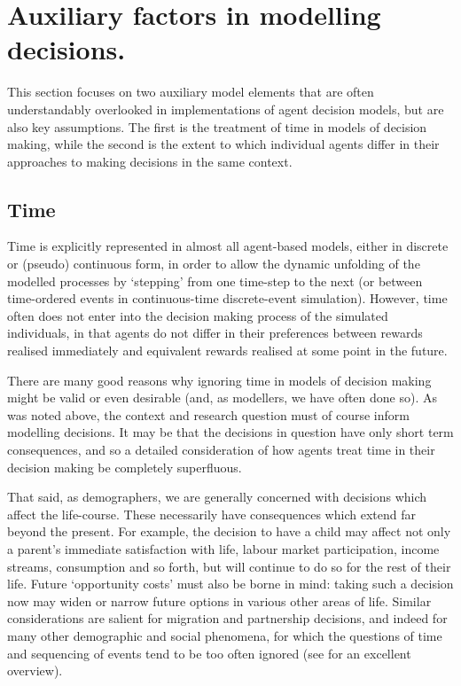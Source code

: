 \documentclass{article}
\begin{document}
\section{Auxiliary factors in modelling
decisions.}\label{auxiliary-factors-in-modelling-decisions}

This section focuses on two auxiliary model elements that are often understandably overlooked in implementations of agent decision models, but are also key assumptions. The first is the treatment of time in models of decision making, while the second is the extent to which individual agents differ in their approaches to making decisions in the same context.

\subsection{Time}\label{time}

Time is explicitly represented in almost all agent-based models, either in discrete or (pseudo) continuous form, in order to allow the dynamic unfolding of the modelled processes by `stepping' from one time-step to the next (or between time-ordered events in continuous-time discrete-event simulation). However, time often  does not enter into the decision making process of the simulated individuals, in that agents do not differ in their preferences between rewards realised immediately and equivalent rewards realised at some point in the future. 

There are many good reasons why ignoring time in models of decision making might be valid or even desirable (and, as modellers, we have often done so). As was noted above, the context and research question must of course inform modelling decisions. It may be that the decisions in question have only short term consequences, and so a detailed consideration of how agents treat time in their decision making be completely superfluous.

That said, as demographers, we are generally concerned with decisions which affect the life-course. These necessarily have consequences which extend far beyond the present. For example, the decision to have a child may affect not only a parent's immediate satisfaction with life, labour market participation, income streams, consumption and so forth, but will continue to do so for the rest of their life. Future `opportunity costs' must also be borne in mind: taking such a decision now may widen or narrow future options in various other areas of life. Similar considerations are salient for migration and partnership decisions, and indeed for many other demographic and social phenomena, for which the questions of time and sequencing of events tend to be too often ignored (see \citet{Abbott2001} for an excellent overview).
\end{document}
